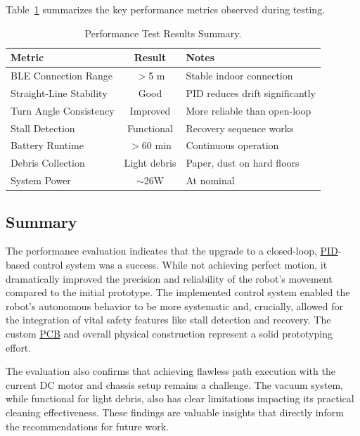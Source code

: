 Table~\ref{tab:test_results} summarizes the key performance metrics observed during testing.

\begin{table}[htbp]
\centering
\caption{Performance Test Results Summary.}
\label{tab:test_results}
\begin{tabular}{|l|c|l|}
\hline
\textbf{Metric} & \textbf{Result} & \textbf{Notes} \\ \hline
BLE Connection Range & $>$5 m & Stable indoor connection \\ \hline
Straight-Line Stability & Good & PID reduces drift significantly \\ \hline
Turn Angle Consistency & Improved & More reliable than open-loop \\ \hline
Stall Detection & Functional & Recovery sequence works \\ \hline
Battery Runtime & $>$60 min & Continuous operation \\ \hline
Debris Collection & Light debris & Paper, dust on hard floors \\ \hline
System Power & $\sim$26W & At \totalVoltage{} nominal \\ \hline
\end{tabular}
\end{table}
\subsection{Summary}
\label{subsec:discussion_performance_evaluation_new}

The performance evaluation indicates that the upgrade to a closed-loop, \hyperref[term:pid]{PID}-based control system was a success. While not achieving perfect motion, it dramatically improved the precision and reliability of the robot's movement compared to the initial prototype. The implemented control system enabled the robot's autonomous behavior to be more systematic and, crucially, allowed for the integration of vital safety features like stall detection and recovery. The custom \hyperref[term:pcb]{PCB} and overall physical construction represent a solid prototyping effort.

The evaluation also confirms that achieving flawless path execution with the current DC motor and chassis setup remains a challenge. The vacuum system, while functional for light debris, also has clear limitations impacting its practical cleaning effectiveness. These findings are valuable insights that directly inform the recommendations for future work.

